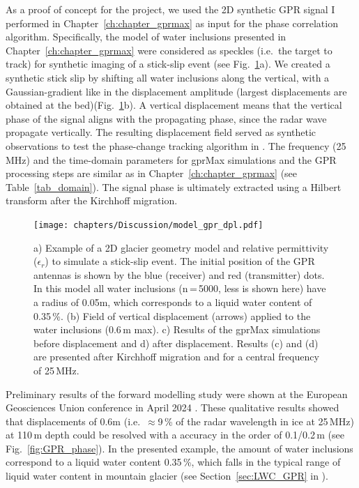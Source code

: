 As a proof of concept for the project, we used the 2D synthetic GPR signal I performed in Chapter~\ref{ch:chapter_gprmax} as input for the phase correlation algorithm. Specifically, the model of water inclusions presented in Chapter~\ref{ch:chapter_gprmax} were considered as speckles (i.e.\ the target to track) for synthetic imaging of a stick-slip event (see Fig.~\ref{fig:GPR_geometrie_dpl}a). We created a synthetic stick slip by shifting all water inclusions along the vertical, with a Gaussian-gradient like in the displacement amplitude (largest displacements are obtained at the bed)(Fig.~\ref{fig:GPR_geometrie_dpl}b). A vertical displacement means that the vertical phase of the signal aligns with the propagating phase, since the radar wave propagate vertically. The resulting displacement field served as synthetic observations to test the phase-change tracking algorithm in \cite{Aichele2019}. The frequency (25\,MHz) and the time-domain parameters for gprMax simulations and the GPR processing steps are similar as in Chapter~\ref{ch:chapter_gprmax} (see Table~\ref{tab_domain}). The signal phase is ultimately extracted using a Hilbert transform after the Kirchhoff migration.


\begin{figure}[H]
    \centering
    \texttt{[image: chapters/Discussion/model\_gpr\_dpl.pdf]}
    \caption{a) Example of a 2D glacier geometry model and relative permittivity ($\epsilon_r$) to simulate a stick-slip event. The initial position of the GPR antennas is shown by the blue (receiver) and red (transmitter) dots. In this model all water inclusions (n\,=\,5000, less is shown here) have a radius of 0.05m, which corresponds to a liquid water content of 0.35\,\%. (b) Field of vertical displacement (arrows) applied to the water inclusions (0.6\,m max). c) Results of the gprMax simulations before displacement and d) after displacement. Results (c) and (d) are presented after Kirchhoff migration and for a central frequency of 25\,MHz.}
    \label{fig:GPR_geometrie_dpl}
\end{figure}


Preliminary results of the forward modelling study were shown at the European Geosciences Union conference in April 2024 \citep{Aichele&al2024}. These qualitative results showed that displacements of 0.6m (i.e.\ $\approx$9\,\% of the radar wavelength in ice at 25\,MHz) at 110\,m depth could be resolved with a accuracy in the order of 0.1/0.2\,m (see Fig.~\ref{fig:GPR_phase}). In the presented example, the amount of water inclusions correspond to a liquid water content 0.35\,\%, which falls in the typical range of liquid water content in mountain glacier (see Section~\ref{sec:LWC_GPR} in \citep{Ogier&al2023}).


